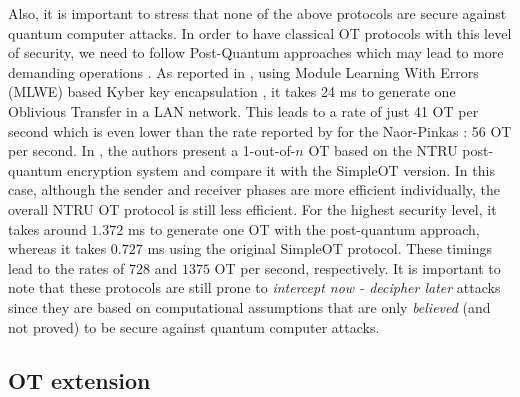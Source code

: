 Also, it is important to stress that none of the above protocols are secure against quantum computer attacks. In order to have classical OT protocols with this level of security, we need to follow Post-Quantum approaches which may lead to more demanding operations \cite{PST19}. As reported in \cite{MR19}, using Module Learning With Errors (MLWE) based Kyber key encapsulation \cite{CrystalKyber17}, it takes 24 ms to generate one Oblivious Transfer in a LAN network. This leads to a rate of just 41 OT per second which is even lower than the rate reported by \cite{ALSZ13} for the Naor-Pinkas \cite{NP01}: 56 OT per second. In \cite{NTRUOT1, NTRUOT2}, the authors present a 1-out-of-$n$ OT based on the NTRU post-quantum encryption system \cite{NTRU} and compare it with the SimpleOT \cite{CO15} version. In this case, although the sender and receiver phases are more efficient individually, the overall NTRU OT protocol is still less efficient. For the highest security level, it takes around $1.372$ ms to generate one OT with the post-quantum approach, whereas it takes $0.727$ ms using the original SimpleOT protocol. These timings lead to the rates of $728$ and $1375$ OT per second, respectively. It is important to note that these protocols are still prone to \textit{intercept now - decipher later} attacks since they are based on computational assumptions that are only \textit{believed} (and not proved) to be secure against quantum computer attacks.


\subsection{OT extension} \label{Ext-OT_comp}

